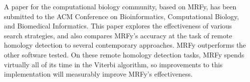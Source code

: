 A paper for the computational biology community, based on MRFy, has been
submitted to the ACM Conference on Bioinformatics, Computational Biology, and 
Biomedical Informatics.
This paper explores the effectiveness of various search strategies, and also
compares MRFy's accuracy at the task of remote homology detection to several
contemporary approaches.
MRFy outperforms the other software tested.
On these remote homology detection tasks, MRFy spends virtually all of its
time in the Viterbi algorithm, so improvements to this implementation will
measurably improve MRFy's effectiveness.